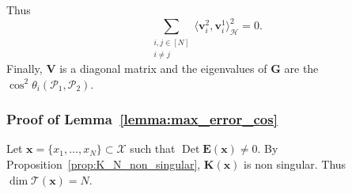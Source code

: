 \documentclass[twoside,11pt]{book}
\numberwithin{theorem}{chapter}
\numberwithin{definition}{chapter}
\numberwithin{proposition}{chapter}
\numberwithin{corollary}{chapter}
\numberwithin{example}{chapter}
\numberwithin{lemma}{chapter}
\numberwithin{assumption}{chapter}
\DeclareMathOperator{\Det}{Det}
\begin{document}
Thus
\begin{equation}
\sum\limits_{\substack{i,j \in [N]\\ i \neq j}} \langle \bm{v}_{i}^{2}, \bm{v}_{i}^{1}\rangle_{\mathcal{H}}^{2} = 0 .
\end{equation}
Finally, $\bm{V}$ is a diagonal matrix and the eigenvalues of $\bm{G}$ are the $\cos^{2} \theta_{i}(\mathcal{P}_{1},\mathcal{P}_{2})$.
\subsubsection{Proof of Lemma~\ref{lemma:max_error_cos}}

Let $\bm{x} = \{x_{1}, \dots , x_{N}\} \subset \mathcal{X}$ such that $\Det \bm{E}(\bm{x}) \neq 0$. By Proposition~\ref{prop:K_N_non_singular}, $\bm{K}(\bm{x})$ is non singular. Thus $\dim \mathcal{T}(\bm{x}) = N$. 
\end{document}
